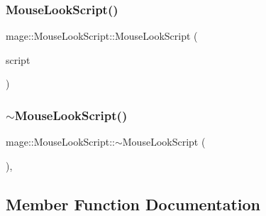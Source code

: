 \hypertarget{classmage_1_1_mouse_look_script_aaca52076bde601772344c61639345e03}{}\label{classmage_1_1_mouse_look_script_aaca52076bde601772344c61639345e03} 
\subsubsection{\texorpdfstring{Mouse\+Look\+Script()}{MouseLookScript()}\hspace{0.1cm}{\footnotesize\ttfamily [3/3]}}
{\footnotesize\ttfamily mage\+::\+Mouse\+Look\+Script\+::\+Mouse\+Look\+Script (\begin{DoxyParamCaption}\item[{\hyperlink{classmage_1_1_mouse_look_script}{Mouse\+Look\+Script} \&\&}]{script }\end{DoxyParamCaption})\hspace{0.3cm}{\ttfamily [default]}}

\hypertarget{classmage_1_1_mouse_look_script_ac402a33218e69d3594102b606dd051dc}{}\label{classmage_1_1_mouse_look_script_ac402a33218e69d3594102b606dd051dc} 
\subsubsection{\texorpdfstring{$\sim$\+Mouse\+Look\+Script()}{~MouseLookScript()}}
{\footnotesize\ttfamily mage\+::\+Mouse\+Look\+Script\+::$\sim$\+Mouse\+Look\+Script (\begin{DoxyParamCaption}{ }\end{DoxyParamCaption})\hspace{0.3cm}{\ttfamily [virtual]}, {\ttfamily [default]}}



\subsection{Member Function Documentation}
\hypertarget{classmage_1_1_mouse_look_script_a43d226ce0c1d8232bfe231cbcb20698e}{}\label{classmage_1_1_mouse_look_script_a43d226ce0c1d8232bfe231cbcb20698e} 
